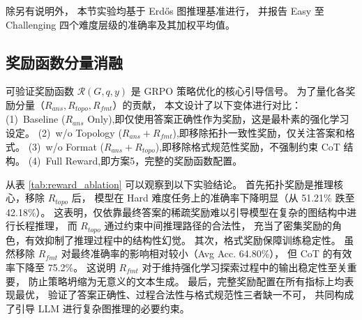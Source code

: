 除另有说明外，
本节实验均基于 Erdős 图推理基准进行，
并报告 Easy 至 Challenging 四个难度层级的准确率及其加权平均值。

\subsection{奖励函数分量消融}
\label{subsec:reward_ablation}

可验证奖励函数 $\mathcal{R}(G,q,y)$ 是 GRPO 策略优化的核心引导信号。
为了量化各奖励分量（$R_{ans}, R_{topo}, R_{fmt}$）的贡献，
本文设计了以下变体进行对比：
(1)\ Baseline ($R_{ans}$ Only),即仅使用答案正确性作为奖励，这是最朴素的强化学习设定。
(2)\ {w/o Topology ($R_{ans} + R_{fmt}$)},即移除拓扑一致性奖励，仅关注答案和格式。
(3)\ {w/o Format ($R_{ans} + R_{topo}$)},即移除格式规范性奖励，不强制约束 CoT 结构。
(4)\ {Full Reward},即方案5，完整的奖励函数配置。

\begin{table}[htbp]
\centering
\caption{强化学习奖励函数组件的消融实验}
\label{tab:reward_ablation}
\small
\setlength{\tabcolsep}{8pt}
\renewcommand{\arraystretch}{1.2}
\end{table}

从表 \ref{tab:reward_ablation} 可以观察到以下实验结论。
首先拓扑奖励是推理核心，移除 $R_{topo}$ 后，
模型在 Hard 难度任务上的准确率下降明显（从 51.21\% 跌至 42.18\%）。
这表明，仅依靠最终答案的稀疏奖励难以引导模型在复杂的图结构中进行长程推理，
而 $R_{topo}$ 通过约束中间推理路径的合法性，
充当了密集奖励的角色，有效抑制了推理过程中的结构性幻觉。
其次，格式奖励保障训练稳定性。
虽然移除 $R_{fmt}$ 对最终准确率的影响相对较小（Avg Acc. 64.80\%），
但 CoT 的有效率下降至 75.2\%。
这说明 $R_{fmt}$ 对于维持强化学习探索过程中的输出稳定性至关重要，
防止策略坍缩为无意义的文本生成。
最后，完整奖励配置在所有指标上均表现最优，
验证了答案正确性、过程合法性与格式规范性三者缺一不可，
共同构成了引导 LLM 进行复杂图推理的必要约束。

